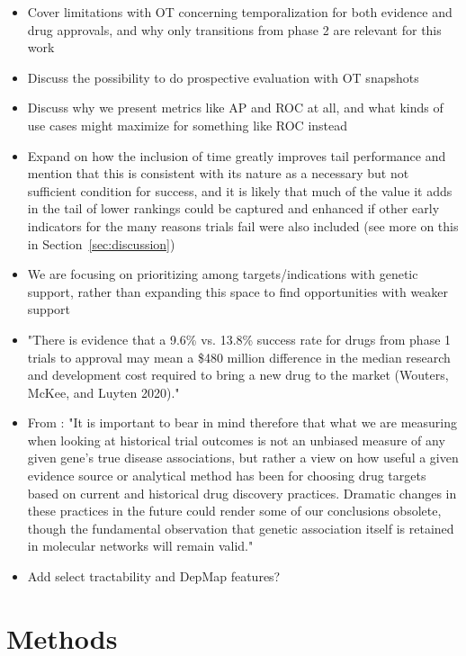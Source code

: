 \documentclass{article}
\begin{document}
\begin{itemize}
  \item Cover limitations with OT concerning temporalization for both evidence and drug approvals, and why only transitions from phase 2 are relevant for this work
  \item Discuss the possibility to do prospective evaluation with OT snapshots
  \item Discuss why we present metrics like AP and ROC at all, and what kinds of use cases might maximize for something like ROC instead
  \item Expand on how the inclusion of time greatly improves tail performance and mention that this is consistent with its nature as a necessary but not sufficient condition for success, and it is likely that much of the value it adds in the tail of lower rankings could be captured and enhanced if other early indicators for the many reasons trials fail \cite{Razuvayevskaya2023.02.07.23285407} were also included (see more on this in Section~\ref{sec:discussion})
  \item We are focusing on prioritizing among targets/indications with genetic support, rather than expanding this space to find opportunities with weaker support
  \item "There is evidence that a 9.6\% vs. 13.8\% success rate for drugs from phase 1 trials to approval may mean a \$480 million difference in the median research and development cost required to bring a new drug to the market (Wouters, McKee, and Luyten 2020)." \cite{PMID:34930919}
  \item From \cite{PMID:33262371}: "It is important to bear in mind therefore that what we are measuring when looking at historical trial outcomes is not an unbiased measure of any given gene's true disease associations, but rather a view on how useful a given evidence source or analytical method has been for choosing drug targets based on current and historical drug discovery practices. Dramatic changes in these practices in the future could render some of our conclusions obsolete, though the fundamental observation that genetic association itself is retained in molecular networks will remain valid."
  \item Add select tractability and DepMap features?
\end{itemize}

\section{Methods}
\label{sec:methods}
\end{document}
